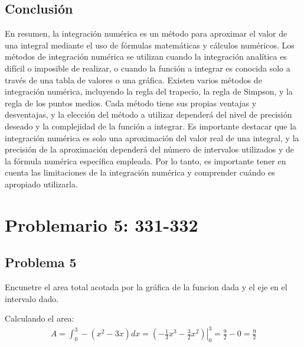 \documentclass{article}
\begin{document}
\subsection{Conclusión}
En resumen, la integración numérica es un método para aproximar el valor de una integral mediante el uso de fórmulas matemáticas y cálculos numéricos. Los métodos de integración numérica se utilizan cuando la integración analítica es difícil o imposible de realizar, o cuando la función a integrar es conocida solo a través de una tabla de valores o una gráfica.
\newline
Existen varios métodos de integración numérica, incluyendo la regla del trapecio, la regla de Simpson, y la regla de los puntos medios. Cada método tiene sus propias ventajas y desventajas, y la elección del método a utilizar dependerá del nivel de precisión deseado y la complejidad de la función a integrar.
\newline
Es importante destacar que la integración numérica es solo una aproximación del valor real de una integral, y la precisión de la aproximación dependerá del número de intervalos utilizados y de la fórmula numérica específica empleada. Por lo tanto, es importante tener en cuenta las limitaciones de la integración numérica y comprender cuándo es apropiado utilizarla.

\section{Problemario 5: 331-332}
\subsection{Problema 5}
Encunetre el area total acotada por la gráfica de la funcion dada y el eje en el intervalo dado.

\begin{center}
\end{center}

Calculando el area:
\begin{align*}
  A = \int_{0}^{3} -(x^2-3x)dx = \left.\left(-\frac{1}{3}x^3-\frac{3}{2}x^2\right)\right|_{0}^{3} = \frac{9}{2} - 0 = \frac{9}{2}
\end{align*}
\end{document}
